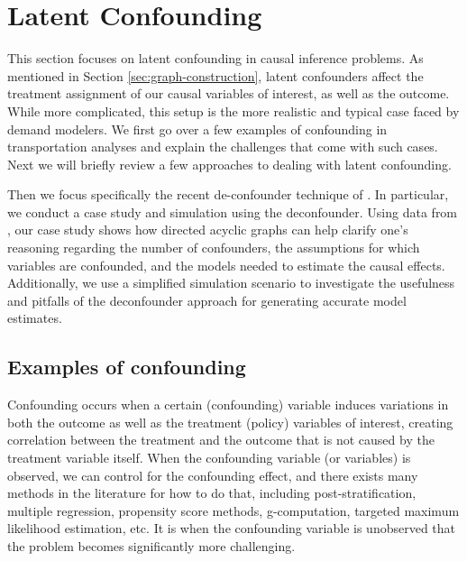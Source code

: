 \section{Latent Confounding}
\label{sec:latent-confounding}

This section focuses on latent confounding in causal inference problems.
As mentioned in Section \ref{sec:graph-construction},  latent confounders affect the treatment assignment of our causal variables of interest, as well as the outcome.
While more complicated, this setup is the more realistic and typical case faced by demand modelers.
We first go over a few examples of confounding in transportation analyses and explain
the challenges that come with such cases.
Next we will briefly review a few approaches to dealing with latent confounding.

Then we focus specifically the recent de-confounder technique of \citet{wang_2019_blessings}.
In particular, we conduct a case study and simulation using the deconfounder.
Using data from \citet{brathwaite_asymmetric}, our case study shows how directed acyclic graphs can help clarify
one's reasoning regarding the number of confounders,
the assumptions for which variables are confounded,
and the models needed to estimate the causal effects.
Additionally, we use a simplified simulation scenario to investigate the usefulness
and pitfalls of the deconfounder approach for generating accurate model estimates.

\subsection{Examples of confounding}
\label{sec:confounding-examples}

Confounding occurs when a certain (confounding) variable induces variations in
both the outcome as well as the treatment (policy) variables of interest,
creating correlation between the treatment and the outcome that is not caused
by the treatment variable itself. When the confounding variable (or variables) is
observed, we can control for the confounding effect, and there exists many
methods in the literature for how to do that, including post-stratification,
multiple regression, propensity score methods, g-computation, targeted maximum likelihood estimation, etc.
It is when the confounding variable is unobserved that the problem becomes significantly more challenging.


